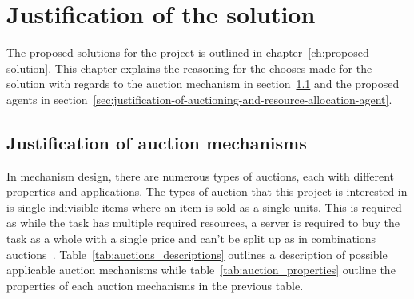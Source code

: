 \chapter{Justification of the solution}\label{ch:justification-of-the-solution}
The proposed solutions for the project is outlined in chapter~\ref{ch:proposed-solution}. This chapter
explains the reasoning for the chooses made for the solution with regards to the auction mechanism in
section~\ref{sec:justification-of-auction-mechanisms} and the proposed agents in
section~\ref{sec:justification-of-auctioning-and-resource-allocation-agent}.

\section{Justification of auction mechanisms}\label{sec:justification-of-auction-mechanisms}
In mechanism design, there are numerous types of auctions, each with different properties and applications.
The types of auction that this project is interested in is single indivisible items where an item is sold as a single
units. This is required as while the task has multiple required resources, a server is required to buy the task as a
whole with a single price and can't be split up as in combinations auctions~\citep{combinational_auctions}.
Table~\ref{tab:auctions_descriptions} outlines a description of possible applicable auction mechanisms while
table~\ref{tab:auction_properties} outline the properties of each auction mechanisms in the previous table.

